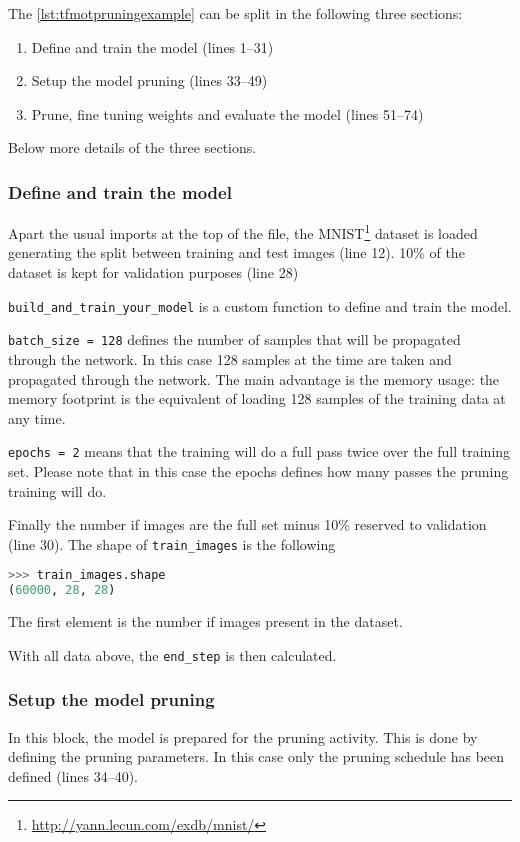 The \autoref{lst:tfmotpruningexample} can be split in the following three
sections:

\begin{enumerate}
    \item Define and train the model (lines 1--31)
    \item Setup the model pruning (lines 33--49)
    \item Prune, fine tuning weights and evaluate the model (lines 51--74)
\end{enumerate}

Below more details of the three sections.

\subsubsection{Define and train the model}
Apart the usual imports at the top of the file, the
MNIST\footnote{\url{http://yann.lecun.com/exdb/mnist/}} dataset is loaded
generating the split between training and test images (line 12).
10\% of the dataset is kept for validation purposes (line 28)

\texttt{build\_and\_train\_your\_model} is a custom function to define and
train the model.

\texttt{batch\_size = 128} defines the number of samples that will be
propagated through the network. In this case 128 samples at the time are taken
and propagated through the network.
The main advantage is the memory usage: the memory footprint is the equivalent
of loading 128 samples of the training data at any time.

\texttt{epochs = 2} means that the training will do a full pass twice over the
full training set. Please note that in this case the epochs defines how many
passes the pruning training will do.

Finally the number if images are the full set minus 10\% reserved to
validation (line 30). The shape of \texttt{train\_images} is the following

\begin{lstlisting}[language=Python, caption=Shape of train\_images]
>>> train_images.shape
(60000, 28, 28)
\end{lstlisting}

The first element is the number if images present in the dataset.

With all data above, the \texttt{end\_step} is then calculated.

\subsubsection{Setup the model pruning}
In this block, the model is prepared for the pruning activity.
This is done by defining the pruning parameters. In this case only the pruning
schedule has been defined (lines 34--40).

